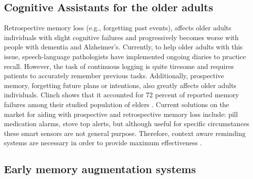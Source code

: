 




\iffalse

\subsection{Cognitive Assistants for the older adults}

Retrospective memory loss (e.g., forgetting past events), affects older adults individuals with slight cognitive failures and progressively becomes worse with people with dementia and Alzheimer’s. Currently, to help older adults with this issue, speech-language pathologists have implemented ongoing diaries to practice recall. However, the task of continuous logging is quite tiresome and requires patients to accurately remember previous tasks. Additionally, prospective memory, forgetting future plans or intentions, also greatly affects older adults individuals. Clinch shows that it accounted for 72 percent of reported memory failures among their studied population of elders \cite{clinch2018learning}. Current solutions on the market for aiding with prospective and retrospective memory loss include: pill medication alarms, stove top alerts, but although useful for specific circumstances these smart sensors are not general purpose. Therefore, context aware reminding systems are necessary in order to provide maximum effectiveness \cite{4517478}.   

\subsection{Early memory augmentation systems}

